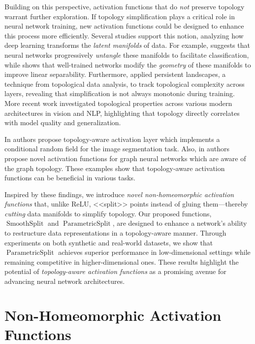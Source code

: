 \documentclass{esannV2}
\DeclareMathOperator{\smoothsplit}{\mathrm{SmoothSplit}}
\DeclareMathOperator{\parametricsplit}{\mathrm{ParametricSplit}}
\begin{document}
  Building on this perspective, activation functions that do \textit{not} preserve topology warrant further exploration.
  If topology simplification plays a critical role in neural network training, new activation functions could be designed to enhance this process more efficiently.
  Several studies support this notion, analyzing how deep learning transforms the \textit{latent manifolds} of data.
  For example, \cite{why_DL_works} suggests that neural networks progressively \textit{untangle} these manifolds to facilitate classification, while \cite{sep_and_geo} shows that well-trained networks modify the \textit{geometry} of these manifolds to improve linear separability. Furthermore, \cite{activation_lands} applied persistent landscapes, a technique from topological data analysis, to track topological complexity across layers, revealing that simplification is not always monotonic during training. More recent work \cite{magai2023deep} investigated topological properties across various modern architectures in vision and NLP, highlighting that topology directly correlates with model quality and generalization.

  In \cite{baxter:hal-03001770} authors propose topology-aware activation layer which implements a conditional random field for the image segmentation task. Also, in \cite{9231732} authors propose novel activation functions for graph neural networks which are aware of the graph topology. These examples show that topology-aware activation functions can be beneficial in various tasks.

  Inspired by these findings, we introduce \textit{novel non-homeomorphic activation functions} that, unlike ReLU, <<split>> points instead of gluing them—thereby \textit{cutting} data manifolds to simplify topology. Our proposed functions, \( \smoothsplit \) and \( \parametricsplit \), are designed to enhance a network’s ability to restructure data representations in a topology-aware manner.
  Through experiments on both synthetic and real-world datasets, we show that $\parametricsplit$ achieves superior performance in low-dimensional settings while remaining competitive in higher-dimensional ones. These results highlight the potential of \textit{topology-aware activation functions} as a promising avenue for advancing neural network architectures.
\fi
\section{Non-Homeomorphic Activation Functions}
\end{document}
